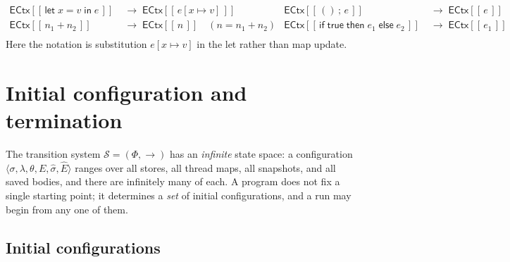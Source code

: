 \documentclass[manuscript,nonacm]{acmart}
\theoremstyle{acmdefinition}
\newcommand{\reduces}{\longrightarrow}
\newcommand{\unit}{()}
\newcommand{\subst}[3]{#1[#2\mapsto #3]}
\newcommand{\ectx}{\mathsf{ECtx}}
\newcommand{\ehole}[1]{\ectx[[\, #1 \,]]}
\begin{document}
\[
\begin{aligned}
\ehole{\textsf{let}\;x = v\;\textsf{in}\;e} &\;\reduces\; \ehole{\subst{e}{x}{v}} &
\ehole{\unit \,;\, e} &\;\reduces\; \ehole{e} \\
\ehole{n_1 + n_2} &\;\reduces\; \ehole{n} \quad (n = n_1 + n_2) &
\ehole{\textsf{if}\;\textsf{true}\;\textsf{then}\;e_1\;\textsf{else}\;e_2}
   &\;\reduces\; \ehole{e_1} \\
\end{aligned}
\]
Here the notation is substitution $\subst{e}{x}{v}$ in the \textsf{let}
rather than map update.




\section{Initial configuration and termination}
\label{sec:init-final}

The transition system $\mathcal{S}=(\Phi,\rightarrow)$ has an \emph{infinite}
state space: a configuration $\langle\sigma,\lambda,\theta,E,\hat{\sigma},\hat{E}\rangle$
ranges over all stores, all thread maps, all snapshots, and all saved bodies, and
there are infinitely many of each. A program does not fix a single starting point;
it determines a \emph{set} of initial configurations, and a run may begin from any
one of them.

\subsection{Initial configurations}
\end{document}
